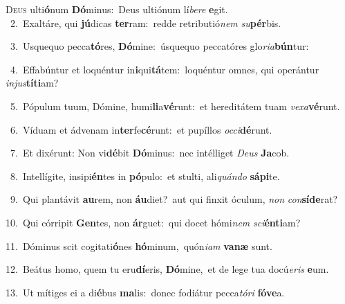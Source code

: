 \lettrine{\initial\textcolor{\initialcolor}{D}}{eus} ulti\-\textbf{ó}\-num \textbf{Dó}\-minus:~\star Deus ultiónum lí\-\textit{be}\-\textit{re} \textbf{e}\-git.\\
{\numbfont\textcolor{\numbcolor}{~2.}}~Exaltáre, qui \textbf{jú}\-dicas \textbf{ter}\-ram:~\star redde retributió\textit{nem} \textit{su}\-\textbf{pér}bis.\par
{\numbfont\textcolor{\numbcolor}{~3.}}~Usquequo pecca\-\textbf{tó}\-res, \textbf{Dó}\-mine:~\star úsquequo peccatóres glo\-\textit{ri}\-\textit{a}\textbf{bún}tur:\par
{\numbfont\textcolor{\numbcolor}{~4.}}~Effabúntur et loquéntur in\-\textbf{i}\-qui\-\textbf{tá}\-tem:~\star loquéntur omnes, qui operántur \textit{in}\-\textit{jus}\textbf{tí}\textbf{ti}am?\par
{\numbfont\textcolor{\numbcolor}{~5.}}~Pópulum tuum, Dómine, humi\-\textbf{li}\-a\-\textbf{vé}\-runt:~\star et hereditátem tuam \textit{ve}\-\textit{xa}\textbf{vé}runt.\par
{\numbfont\textcolor{\numbcolor}{~6.}}~Víduam et ádvenam in\-\textbf{ter}\-fe\-\textbf{cé}\-runt:~\star et pupíllos \textit{oc}\-\textit{ci}\textbf{dé}runt.\par
{\numbfont\textcolor{\numbcolor}{~7.}}~Et dixérunt: Non vi\-\textbf{dé}\-bit \textbf{Dó}\-minus:~\star nec intélliget \textit{De}\-\textit{us} \textbf{Ja}\-cob.\par
{\numbfont\textcolor{\numbcolor}{~8.}}~Intellígite, insipi\-\textbf{én}\-tes in \textbf{pó}\-pulo:~\star et stulti, ali\-\textit{quán}\-\textit{do} \textbf{sá}\-\textbf{pi}te.\par
{\numbfont\textcolor{\numbcolor}{~9.}}~Qui plantávit \textbf{au}\-rem, non \textbf{áu}\-diet?~\star aut qui finxit óculum, \textit{non} \textit{con}\-\textbf{sí}\textbf{de}rat?\par
{\numbfont\textcolor{\numbcolor}{10.}}~Qui córripit \textbf{Gen}\-tes, non \textbf{ár}\-guet:~\star qui docet hómi\textit{nem} \textit{sci}\-\textbf{én}\textbf{ti}am?\par
{\numbfont\textcolor{\numbcolor}{11.}}~Dóminus scit cogitati\-\textbf{ó}\-nes \textbf{hó}\-minum,~\star quón\-\textit{i}\-\textit{am} \textbf{va}\-\textbf{næ} sunt.\par
{\numbfont\textcolor{\numbcolor}{12.}}~Beátus homo, quem tu eru\-\textbf{dí}\-eris, \textbf{Dó}\-mine,~\star et de lege tua docú\-\textit{e}\-\textit{ris} \textbf{e}\-um.\par
{\numbfont\textcolor{\numbcolor}{13.}}~Ut mítiges ei a di\-\textbf{é}\-bus \textbf{ma}\-lis:~\star donec fodiátur pecca\-\textit{tó}\-\textit{ri} \textbf{fó}\-\textbf{ve}a.\par
